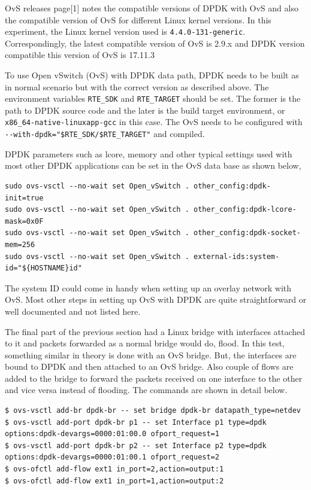 \documentclass[english, 12pt, a4paper, elec, utf8, a-1b, online]{aaltothesis}
\begin{document}
OvS releases page[1] notes the compatible versions of DPDK with OvS and also the compatible version of OvS for different Linux kernel versions. In this experiment, the Linux kernel version used is \lstinline{4.4.0-131-generic}. Correspondingly, the latest compatible version of OvS is 2.9.x and DPDK version compatible this version of OvS is 17.11.3

To use Open vSwitch (OvS) with DPDK data path, DPDK needs to be built as in normal scenario but with the correct version as described above. The environment variables \lstinline{RTE_SDK} and \lstinline{RTE_TARGET} should be set. The former is the path to DPDK source code and the later is the build target environment, or \lstinline{x86_64-native-linuxapp-gcc} in this case. The OvS needs to be configured with \lstinline{--with-dpdk="$RTE_SDK/$RTE_TARGET"} and compiled.

DPDK parameters such as lcore, memory and other typical settings used with most other DPDK applications can be set in the OvS data base as shown below,

\begin{lstlisting}[basicstyle={\small\ttfamily}]
sudo ovs-vsctl --no-wait set Open_vSwitch . other_config:dpdk-init=true
sudo ovs-vsctl --no-wait set Open_vSwitch . other_config:dpdk-lcore-mask=0x0F
sudo ovs-vsctl --no-wait set Open_vSwitch . other_config:dpdk-socket-mem=256
sudo ovs-vsctl --no-wait set Open_vSwitch . external-ids:system-id="${HOSTNAME}id"

\end{lstlisting}

The system ID could come in handy when setting up an overlay network with OvS. Most other steps in setting up OvS with DPDK are quite straightforward or well documented and not listed here.

The final part of the previous section had a Linux bridge with interfaces attached to it and packets forwarded as a normal bridge would do, flood. In this test, something similar in theory is done with an OvS bridge. But, the interfaces are bound to DPDK and then attached to an OvS bridge. Also couple of flows are added to the bridge to forward the packets received on one interface to the other and vice versa instead of flooding. The commands are shown in detail below.

\begin{lstlisting}[basicstyle={\small\ttfamily}]
$ ovs-vsctl add-br dpdk-br -- set bridge dpdk-br datapath_type=netdev
$ ovs-vsctl add-port dpdk-br p1 -- set Interface p1 type=dpdk options:dpdk-devargs=0000:01:00.0 ofport_request=1
$ ovs-vsctl add-port dpdk-br p2 -- set Interface p2 type=dpdk options:dpdk-devargs=0000:01:00.1 ofport_request=2
$ ovs-ofctl add-flow ext1 in_port=2,action=output:1
$ ovs-ofctl add-flow ext1 in_port=1,action=output:2
\end{lstlisting}
\end{document}
